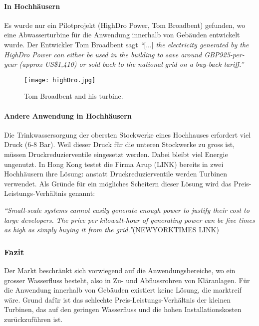 \paragraph{In Hochhäusern}
Es wurde nur ein Pilotprojekt (HighDro Power, Tom Broadbent) gefunden, wo eine Abwasserturbine für die Anwendung innerhalb von Gebäuden entwickelt wurde. Der Entwickler Tom Broadbent sagt \textit{``}[...] \textit{the electricity generated by the HighDro Power can either be used in the building to save around GBP925-per-year (approx US\$1,410) or sold back to the national grid on a buy-back tariff.''}
\newpage
\begin{figure}
\centering
\texttt{[image: highDro.jpg]}
\caption{Tom Broadbent and his turbine.}
\label{fig:turbineTomBroadBent}
\end{figure}
\paragraph{Andere Anwendung in Hochhäusern}
Die Trinkwassersorgung der obersten Stockwerke eines Hochhauses erfordert viel Druck (6-8 Bar). Weil dieser Druck für die unteren Stockwerke zu gross ist, müssen Druckreduzierventile eingesetzt werden. Dabei bleibt viel Energie ungenutzt. In Hong Kong testet die Firma Arup (LINK) bereits in zwei Hochhäusern ihre Lösung: anstatt Druckreduzierventile werden Turbinen verwendet. Als Gründe für ein mögliches Scheitern dieser Lösung wird das Preis-Leistungs-Verhältnis genannt:

\textit{``Small-scale systems cannot easily generate enough power to justify their cost to large developers. The price per kilowatt-hour of generating power can be five times as high as simply buying it from the grid.''}(NEWYORKTIMES LINK)
\subsubsection{Fazit}
Der Markt beschränkt sich vorwiegend auf die Anwendungsbereiche, wo ein grosser Wasserfluss besteht, also in Zu- und Abflussrohren von Kläranlagen. Für die Anwendung innerhalb von Gebäuden existiert keine Lösung, die marktreif wäre. Grund dafür ist das schlechte Preis-Leistungs-Verhältnis der kleinen Turbinen, das auf den geringen Wasserfluss und die hohen Installationskosten zurückzuführen ist.

